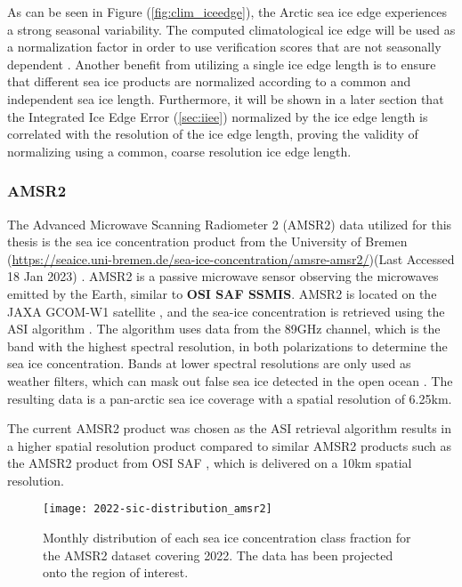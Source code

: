 \documentclass[../main/thesis.tex]{subfiles}
\begin{document}
As can be seen in Figure (\ref{fig:clim_iceedge}), the Arctic sea ice edge experiences a strong seasonal variability. The computed climatological ice edge will be used as a normalization factor in order to use verification scores that are not seasonally dependent \citep{Goessling2016, Zampieri2019, Palerme2019}. Another benefit from utilizing a single ice edge length is to ensure that different sea ice products are normalized according to a common and independent sea ice length. Furthermore, it will be shown in a later section that the Integrated Ice Edge Error \citep{Goessling2016} (\ref{sec:iiee}) normalized by the ice edge length is correlated with the resolution of the ice edge length, proving the validity of normalizing using a common, coarse resolution ice edge length.

\subsubsection{AMSR2}
The Advanced Microwave Scanning Radiometer 2 (AMSR2) data utilized for this thesis is the sea ice concentration product from the University of Bremen (\url{https://seaice.uni-bremen.de/sea-ice-concentration/amsre-amsr2/})(Last Accessed 18 Jan 2023) \citep{Spreen2008}. AMSR2 is a passive microwave sensor observing the microwaves emitted by the Earth, similar to \textbf{OSI SAF SSMIS}. AMSR2 is located on the JAXA GCOM-W1 satellite \cite{Melsheimer2019}, and the sea-ice concentration is retrieved using the ASI algorithm \cite{Spreen2008}. The algorithm uses data from the 89GHz channel, which is the band with the highest spectral resolution, in both polarizations to determine the sea ice concentration. Bands at lower spectral resolutions are only used as weather filters, which can mask out false sea ice detected in the open ocean \cite{Spreen2008}. The resulting data is a pan-arctic sea ice coverage with a spatial resolution of 6.25km.

The current AMSR2 product was chosen as the ASI retrieval algorithm \citep{Spreen2008} results in a higher spatial resolution product compared to similar AMSR2 products such as the AMSR2 product from OSI SAF \citep{Lavelle2016}, which is delivered on a 10km spatial resolution.

\begin{figure}
    \centering
    \texttt{[image: 2022-sic-distribution\_amsr2]}
    \caption{\label{fig:dist-amsr2}Monthly distribution of each sea ice concentration class fraction for the AMSR2 dataset covering 2022. The data has been projected onto the region of interest.}
\end{figure}
\end{document}
